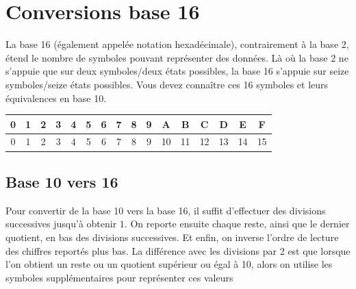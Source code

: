 \documentclass[11pt,a4paper]{article}
\begin{document}

\section{Conversions base 16}

\bigskip

La base 16 (également appelée notation hexadécimale), contrairement à la base 2, étend le nombre de symboles pouvant représenter des données.
Là où la base 2 ne s'appuie que sur deux symboles/deux états possibles, la base 16 s'appuie sur seize symboles/seize états possibles.
Vous devez connaître ces 16 symboles et leurs équivalences en base 10.

\bigskip

\begin{center}
\begin{tabular}{ | c c c c c | c c c c c | c c c c c c | }
\hline
0 & 1 & 2 & 3 & 4  &  5 & 6 & 7 & 8 & 9  &   A &  B &  C &  D &  E &  F \\
\hline
0 & 1 & 2 & 3 & 4  &  5 & 6 & 7 & 8 & 9  &  10 & 11 & 12 & 13 & 14 & 15 \\
\hline
\end{tabular}
\end{center}

\bigskip


\subsection{Base 10 vers 16}

\bigskip

Pour convertir de la base 10 vers la base 16, il suffit d'effectuer des divisions successives jusqu'à obtenir $ 1 $.
On reporte ensuite chaque reste, ainsi que le dernier quotient, en bas des divisions successives.
Et enfin, on inverse l'ordre de lecture des chiffres reportés plus bas.
La différence avec les divisions par 2 est que lorsque l'on obtient un reste ou un quotient supérieur ou égal à 10, alors on utilise les symboles supplémentaires pour représenter ces valeurs

\bigskip
\end{document}
